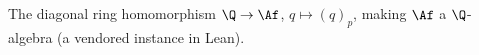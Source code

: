 The diagonal ring homomorphism $\Q\to\Af$, $q\mapsto(q)_p$, making $\Af$ a $\Q$-algebra (a vendored instance in Lean).

